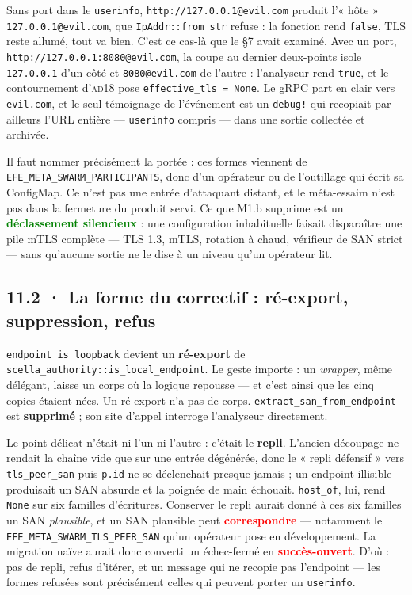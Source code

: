 \documentclass[10pt]{article}
\newcommand{\best}[1]{\textcolor{green}{\textbf{#1}}}
\newcommand{\pire}[1]{\textcolor{red}{\textbf{#1}}}
\newcommand{\code}[1]{\texttt{\small #1}}
\begin{document}
Sans port dans le \code{userinfo}, \code{http://127.0.0.1@evil.com} produit l'« hôte »
\code{127.0.0.1@evil.com}, que \code{IpAddr::from\_str} refuse : la fonction rend \code{false}, TLS
reste allumé, tout va bien. C'est ce cas-là que le §7 avait examiné. Avec un port,
\code{http://127.0.0.1:8080@evil.com}, la coupe au dernier deux-points isole \code{127.0.0.1} d'un
côté et \code{8080@evil.com} de l'autre : l'analyseur rend \code{true}, et le contournement
d'\textsc{ad18} pose \code{effective\_tls = None}. Le gRPC part en clair vers \code{evil.com}, et le
seul témoignage de l'événement est un \code{debug!} qui recopiait par ailleurs l'URL entière ---
\code{userinfo} compris --- dans une sortie collectée et archivée.

Il faut nommer précisément la portée : ces formes viennent de
\code{EFE\_META\_SWARM\_PARTICIPANTS}, donc d'un opérateur ou de l'outillage qui écrit sa ConfigMap.
Ce n'est pas une entrée d'attaquant distant, et le méta-essaim n'est pas dans la fermeture du
produit servi. Ce que M1.b supprime est un \best{déclassement silencieux} : une configuration
inhabituelle faisait disparaître une pile mTLS complète --- TLS 1.3, mTLS, rotation à chaud,
vérifieur de SAN strict --- sans qu'aucune sortie ne le dise à un niveau qu'un opérateur lit.

\subsection{11.2 · La forme du correctif : ré-export, suppression, refus}

\code{endpoint\_is\_loopback} devient un \textbf{ré-export} de
\code{scella\_authority::is\_local\_endpoint}. Le geste importe : un \emph{wrapper}, même délégant,
laisse un corps où la logique repousse --- et c'est ainsi que les cinq copies étaient nées. Un
ré-export n'a pas de corps. \code{extract\_san\_from\_endpoint} est \textbf{supprimé} ; son site
d'appel interroge l'analyseur directement.

Le point délicat n'était ni l'un ni l'autre : c'était le \textbf{repli}. L'ancien découpage ne
rendait la chaîne vide que sur une entrée dégénérée, donc le « repli défensif » vers
\code{tls\_peer\_san} puis \code{p.id} ne se déclenchait presque jamais ; un endpoint illisible
produisait un SAN absurde et la poignée de main échouait. \code{host\_of}, lui, rend \code{None} sur
six familles d'écritures. Conserver le repli aurait donné à ces six familles un SAN
\emph{plausible}, et un SAN plausible peut \pire{correspondre} --- notamment le
\code{EFE\_META\_SWARM\_TLS\_PEER\_SAN} qu'un opérateur pose en développement. La migration naïve
aurait donc converti un échec-fermé en \pire{succès-ouvert}. D'où : pas de repli, refus d'itérer, et
un message qui ne recopie pas l'endpoint --- les formes refusées sont précisément celles qui peuvent
porter un \code{userinfo}.
\end{document}
